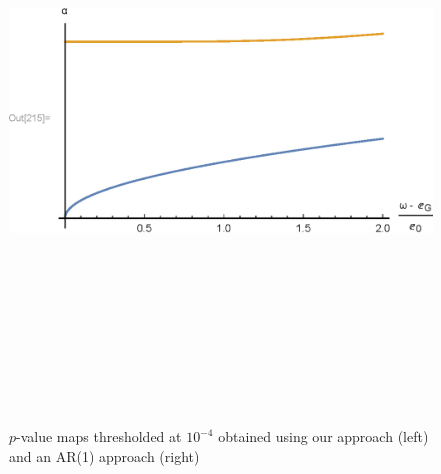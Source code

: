 \documentclass[a0,portrait]{a0poster}
\begin{document}
\begin{multicols}{3}
\begin{figure}
\includegraphics[height=160mm,bb=100 285 500
    570]{AbsFinal.eps}
\caption{$p$-value maps thresholded at $10^{-4}$ obtained using our approach (left) and an AR(1) approach (right)}
\label{vis}          
\end{figure}


\end{multicols}
\end{document}

